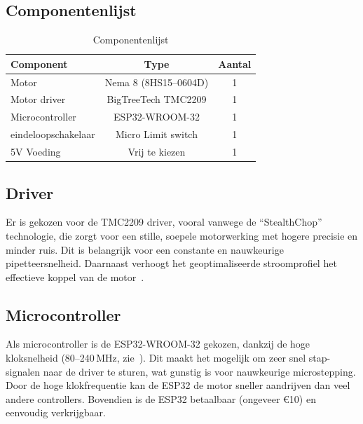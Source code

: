 \subsection{Componentenlijst}
\begin{table}[H]
    \centering
    \caption{Componentenlijst}\label{tab:componentenlijst}
    \begin{tabular}{|l|c|c|}
        \hline
        \textbf{Component} & \textbf{Type} & \textbf{Aantal} \\
        \hline
        Motor & Nema 8 (8HS15--0604D)& 1 \\
        Motor driver & BigTreeTech TMC2209 & 1 \\
        Microcontroller & ESP32-WROOM-32 & 1 \\
        eindeloopschakelaar & Micro Limit switch & 1 \\
        5V Voeding & Vrij te kiezen\footnotemark & 1 \\
        \hline
    \end{tabular}
\end{table}

\subsection{Driver}
Er is gekozen voor de TMC2209 driver, vooral vanwege de ``StealthChop'' technologie, die zorgt voor een stille, soepele motorwerking met hogere precisie en minder ruis. Dit is belangrijk voor een constante en nauwkeurige pipetteersnelheid. Daarnaast verhoogt het geoptimaliseerde stroomprofiel het effectieve koppel van de motor\ \cite{RN45}.

\subsection{Microcontroller}
Als microcontroller is de ESP32-WROOM-32 gekozen, dankzij de hoge kloksnelheid (80–240\,MHz, zie\ \cite{RN47}). Dit maakt het mogelijk om zeer snel stap-signalen naar de driver te sturen, wat gunstig is voor nauwkeurige microstepping. Door de hoge klokfrequentie kan de ESP32 de motor sneller aandrijven dan veel andere controllers. Bovendien is de ESP32 betaalbaar (ongeveer €10) en eenvoudig verkrijgbaar.
